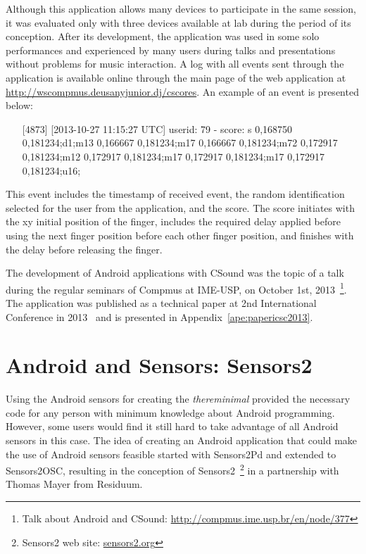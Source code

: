 Although this application allows many devices to participate in the same session, it was evaluated only with three devices available at lab during the period of its conception.
After its development, the application was used in some solo performances and experienced by many users during talks and presentations without problems for music interaction.
A log with all events sent through the application is available online through the main page of the web application at \url{http://wscompmus.deusanyjunior.dj/cscores}.
An example of an event is presented below:

\begin{itemize}\itemsep0em
\item[] [4873] [2013-10-27 11:15:27 UTC] userid: 79 - score: s 0,168750 0,181234;d1;m13 0,166667 0,181234;m17 0,166667 0,181234;m72 0,172917 0,181234;m12 0,172917 0,181234;m17 0,172917 0,181234;m17 0,172917 0,181234;u16;
\end{itemize}

This event includes the timestamp of received event, the random identification selected for the user from the application, and the score.
The score initiates with the xy initial position of the finger, includes the required delay applied before using the next finger position before each other finger position, and finishes with the delay before releasing the finger.

The development of Android applications with CSound was the topic of a talk during the regular seminars of Compmus at IME-USP, on October 1st, 2013~\footnote{Talk about Android and CSound: \url{http://compmus.ime.usp.br/en/node/377}}.
The application was published as a technical paper at 2nd International Conference in 2013~\citep{deCarvalhoJunior2013touches} and is presented in Appendix~\ref{ape:papericsc2013}.


\section{Android and Sensors: Sensors2}
\label{sec:appsensors2}

Using the Android sensors for creating the \textit{thereminimal} provided the necessary code for any person with minimum knowledge about Android programming.
However, some users would find it still hard to take advantage of all Android sensors in this case. %
The idea of creating an Android application that could make the use of Android sensors feasible started with Sensors2Pd and extended to Sensors2OSC, resulting in the conception of Sensors2~\footnote{Sensors2 web site: \url{sensors2.org}} in a partnership with Thomas Mayer from Residuum.

